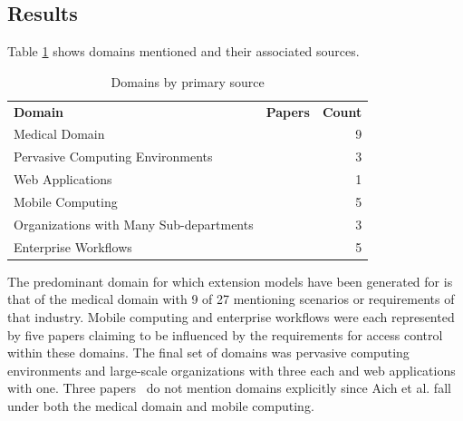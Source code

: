 \subsection{Results}

Table \ref{tab:domains} shows domains mentioned and their associated sources.

\begin{table}
\centering
\caption{Domains by primary source}
\vspace{0.1 in}
\begin{tabular*}{.9\linewidth}{| p{.45\linewidth} | p{.3\linewidth} | r | }
\cline{1-3}

\textbf{Domain} & \textbf{Papers} & \textbf{Count} \\ \cline{1-3}
Medical Domain
&
\cite{alam06:constraint}
\cite{tzelepi01:flexible}
\cite{motta03:contextual}
\cite{ni2010privacy}
\cite{damiani2007geo}
\cite{hansen2003spatial}
\cite{samuel07:spatio-temporal}
\cite{aich09:role}
\cite{zhou2007team}
&
9 \\ \cline{1-3}
Pervasive Computing Environments
& 
\cite{huang06:pervasive}
\cite{chen08:spatio-temporal}
\cite{ray07:spatio}
&
3 \\ \cline{1-3}
Web Applications
& 
\cite{masoumzadeh2008purbac}
&
1 \\ \cline{1-3}
Mobile Computing
& 
\cite{thein2011leveraging}
\cite{zou2009crbac}
\cite{chandran05:llt}
\cite{ray07:spatio}
\cite{aich09:role}
&
5 \\ \cline{1-3}
Organizations with Many Sub-departments
& 
\cite{yamazaki04:designing}
\cite{jian2008extended}
\cite{yao2008task}
&
3 \\ \cline{1-3}
Enterprise Workflows
&
\cite{cholewka00:acontext-sensitive}
\cite{bao08:role}
\cite{zhang06:collaborative}
\cite{oh2003task}
\cite{joshi05:generalized}
&
5 \\ \cline{1-3}

\end{tabular*}
\label{tab:domains}
\end{table}

The predominant domain for which extension models have been generated for is that of the medical domain with 9 of 27 mentioning scenarios or requirements of that industry.
Mobile computing and enterprise workflows were each represented by five papers claiming to be influenced by the requirements for access control within these domains. The final set
of domains was pervasive computing environments and large-scale organizations with three each and web applications with one.  Three papers~\cite{jian2008extended, aich07:STARBAC, haibo2005context} do not mention domains explicitly since Aich et al. \cite{aich09:role} fall under both the medical domain and mobile computing.


